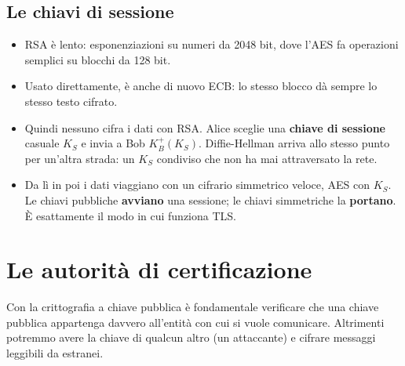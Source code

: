 \subsection{Le chiavi di sessione}

\begin{itemize}
    \item RSA è lento: esponenziazioni su numeri da 2048 bit, dove l'AES fa operazioni semplici su blocchi da 128 bit.
    \item Usato direttamente, è anche di nuovo ECB: lo stesso blocco dà sempre lo stesso testo cifrato.
    \item Quindi nessuno cifra i dati con RSA. Alice sceglie una \textbf{chiave di sessione} casuale $K_S$ e invia a Bob $K_B^+(K_S)$.
          Diffie-Hellman arriva allo stesso punto per un'altra strada: un $K_S$ condiviso che non ha mai attraversato la rete.
    \item Da lì in poi i dati viaggiano con un cifrario simmetrico veloce, AES con $K_S$. Le chiavi pubbliche \textbf{avviano} una
          sessione; le chiavi simmetriche la \textbf{portano}. È esattamente il modo in cui funziona TLS.
\end{itemize}

\section{Le autorità di certificazione}

Con la crittografia a chiave pubblica è fondamentale verificare che una chiave pubblica appartenga davvero all'entità con cui si vuole
comunicare. Altrimenti potremmo avere la chiave di qualcun altro (un attaccante) e cifrare messaggi leggibili da estranei.


